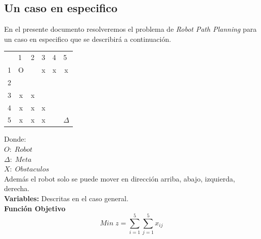 \documentclass[journal, 10pt]{IEEEtran}
\begin{document}
\subsection{Un caso en especifico}
En el presente documento resolveremos el problema de \textit{Robot Path Planning} para un caso en especifico que se describirá a continuación.\\

\begin{table}[H]
\centering
\begin{tabular}{lccccc}
                       & \multicolumn{1}{l}{1}  & \multicolumn{1}{l}{2}  & \multicolumn{1}{l}{3}  & \multicolumn{1}{l}{4}  & \multicolumn{1}{l}{5}         \\ \cline{2-6} 
\multicolumn{1}{l|}{1} & \multicolumn{1}{c|}{O} & \multicolumn{1}{c|}{}  & \multicolumn{1}{c|}{x} & \multicolumn{1}{c|}{x} & \multicolumn{1}{c|}{x}        \\ \cline{2-6} 
\multicolumn{1}{l|}{2} & \multicolumn{1}{c|}{}  & \multicolumn{1}{c|}{}  & \multicolumn{1}{c|}{}  & \multicolumn{1}{c|}{}  & \multicolumn{1}{c|}{}         \\ \cline{2-6} 
\multicolumn{1}{l|}{3} & \multicolumn{1}{c|}{x} & \multicolumn{1}{c|}{x} & \multicolumn{1}{c|}{}  & \multicolumn{1}{c|}{}  & \multicolumn{1}{c|}{}         \\ \cline{2-6} 
\multicolumn{1}{l|}{4} & \multicolumn{1}{c|}{x} & \multicolumn{1}{c|}{x} & \multicolumn{1}{c|}{x} & \multicolumn{1}{c|}{}  & \multicolumn{1}{c|}{}         \\ \cline{2-6} 
\multicolumn{1}{l|}{5} & \multicolumn{1}{c|}{x} & \multicolumn{1}{c|}{x} & \multicolumn{1}{c|}{x} & \multicolumn{1}{c|}{}  & \multicolumn{1}{c|}{$\Delta$} \\ \cline{2-6} 
\end{tabular}
\end{table}
Donde:\\
$O:\; Robot$\\
$\Delta:\;Meta$\\
$X:\;Obstaculos$\\
Además el robot solo se puede mover en dirección arriba, abajo, izquierda, derecha.\\

\textbf{Variables: }Descritas en el caso general.\\

\textbf{Función Objetivo}\\

\[ Min\;z = \sum_{i=1}^5\sum_{j=1}^5{x}_{ij}\] \\
\end{document}
